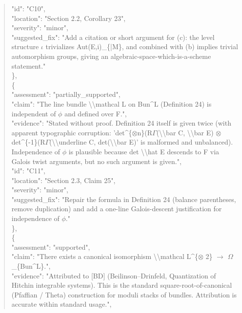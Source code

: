 \documentclass[11pt]{article}
\begin{document}
\begin{quote}
      "id": "C10",\\
      "location": "Section 2.2, Corollary 23",\\
      "severity": "minor",\\
      "suggested\_fix": "Add a citation or short argument for (c): the level structure \ensuremath{\iota} trivializes Aut(E,i)\_\{|M\}, and combined with (b) implies trivial automorphism groups, giving an algebraic-space-which-is-a-scheme statement."\\
    \},\\
    \{\\
      "assessment": "partially\_supported",\\
      "claim": "The line bundle \textbackslash{}\textbackslash{}mathcal L on Bun\^{}L (Definition 24) is independent of \ensuremath{\phi} and defined over F.",\\
      "evidence": "Stated without proof. Definition 24 itself is given twice (with apparent typographic corruption: 'det\^{}\{\ensuremath{\otimes}n\}(R\ensuremath{\Gamma}(\textbackslash{}\textbackslash{}bar C, \textbackslash{}\textbackslash{}bar E) \ensuremath{\otimes} det\^{}\{-1\}(R\ensuremath{\Gamma}(\textbackslash{}\textbackslash{}underline C, det(\textbackslash{}\textbackslash{}bar E)' is malformed and unbalanced). Independence of \ensuremath{\phi} is plausible because det \textbackslash{}\textbackslash{}hat E descends to F via Galois twist arguments, but no such argument is given.",\\
      "id": "C11",\\
      "location": "Section 2.3, Claim 25",\\
      "severity": "minor",\\
      "suggested\_fix": "Repair the formula in Definition 24 (balance parentheses, remove duplication) and add a one-line Galois-descent justification for independence of \ensuremath{\phi}."\\
    \},\\
    \{\\
      "assessment": "supported",\\
      "claim": "There exists a canonical isomorphism \textbackslash{}\textbackslash{}mathcal L\^{}\{\ensuremath{\otimes} 2\} \ensuremath{\to} \ensuremath{\Omega}\_\{Bun\^{}L\}.",\\
      "evidence": "Attributed to [BD] (Beilinson--Drinfeld, Quantization of Hitchin integrable systems). This is the standard square-root-of-canonical (Pfaffian / Theta) construction for moduli stacks of bundles. Attribution is accurate within standard usage.",\\

\end{quote}
\end{document}
